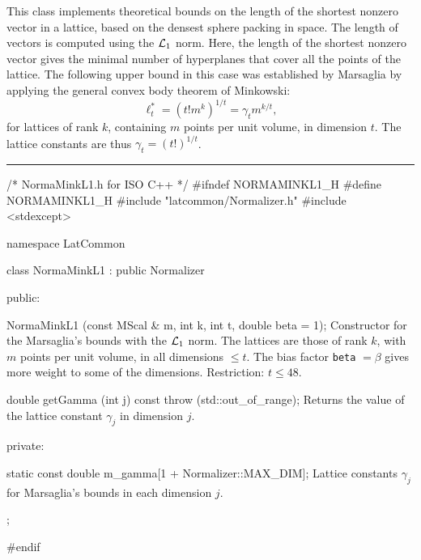 % 
% 
% 
% 


 This class implements theoretical bounds on the length of the shortest
 nonzero vector in a lattice, based on the densest sphere packing in 
 space.  The length of vectors is computed using the
 ${\cal L}_1$ norm. Here,  the length of the shortest nonzero vector
gives the minimal number of hyperplanes that cover all the points of
the lattice. The following upper bound in this case was established by 
Marsaglia \cite{rMAR68a} by  applying the general convex body theorem of
 Minkowski:
\[ 
  \ell_t^* = (t! m^k)^{1/t} = \gamma_t m^{k/t},
\]
 for  lattices of rank $k$, containing $m$ points per unit volume,
 in dimension $t$.
 The lattice constants are thus $\gamma_t = (t!)^{1/t}$.


\bigskip\hrule
\code \hide
/* NormaMinkL1.h for ISO C++ */
#ifndef NORMAMINKL1_H
#define NORMAMINKL1_H
\endhide
#include "latcommon/Normalizer.h"
#include <stdexcept>


namespace LatCommon {

class NormaMinkL1 : public Normalizer {
public:

   NormaMinkL1 (const MScal & m, int k, int t, double beta = 1);
\endcode
 \tabb Constructor for the Marsaglia's bounds with the ${\cal L}_1$ norm. The 
   lattices are those of rank $k$, with $m$ points per unit volume, in all
   dimensions  $\le t$. The bias factor \texttt{beta} $= \beta$ gives more weight
   to some of the dimensions. Restriction: $t \le 48$.
  \endtabb
\code

   double getGamma (int j) const throw (std::out_of_range);
\endcode
 \tabb 
   Returns the value of the lattice constant $\gamma_j$ in dimension  $j$.
 \endtabb
\ifdetailed
\code


private:

   static const double m_gamma[1 + Normalizer::MAX_DIM];
\endcode
 \tabb 
  Lattice constants $\gamma_j$ for Marsaglia's bounds in each
  dimension $j$.
  \endtabb
\fi
\code

};

}
\hide
#endif
\endhide
\endcode

